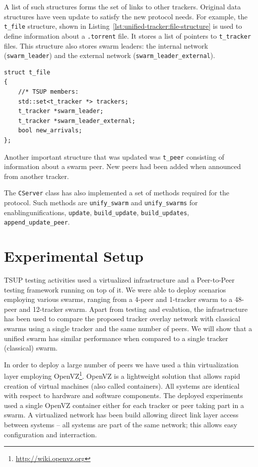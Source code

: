 A list of such structures forms the set of links to other trackers. Original
data structures have veen update to satisfy the new protocol needs. For
example, the \texttt{t\_file} structure, shown in
Listing~\ref{lst:unified-tracker:file-structure} is used to define information
about a \texttt{.torrent} file. It stores a list of pointers to
\texttt{t\_tracker} files. This structure also stores swarm leaders: the
internal network (\texttt{swarm\_leader}) and the external network
(\texttt{swarm\_leader\_external}).

\lstset{language=C,caption=File Structure,label=lst:unified-tracker:file-structure}
\begin{lstlisting}
struct t_file
{
    //* TSUP members:
    std::set<t_tracker *> trackers;
    t_tracker *swarm_leader;
    t_tracker *swarm_leader_external;
    bool new_arrivals;
};
\end{lstlisting}

Another important structure that was updated was \texttt{t\_peer} consisting
of information about a swarm peer. New peers had been added when announced
from another tracker.

The \texttt{CServer} class has also implemented a set of methods required for
the protocol. Such methods are \texttt{unify\_swarm} and
\texttt{unify\_swarms} for enablingunifications, \texttt{update},
\texttt{build\_update}, \texttt{build\_updates},
\texttt{append\_update\_peer}.

\section{Experimental Setup}
\label{sec:unified-tracker:setup}

TSUP testing activities used a virtualized infrastructure and a
Peer-to-Peer testing framework running on top of it. We were able to deploy
scenarios employing various swarms, ranging from a 4-peer and 1-tracker swarm
to a 48-peer and 12-tracker swarm. Apart from testing and evalution, the
infrastructure has been used to compare the proposed tracker overlay network
with classical swarms using a single tracker and the same number of peers. We
will show that a unified swarm has similar performance when compared to a
single tracker (classical) swarm.

In order to deploy a large number of peers we have used a thin virtualization
layer employing OpenVZ\footnote{\url{http://wiki.openvz.org}}. OpenVZ is a
lightweight solution that allows rapid creation of virtual machines (also
called containers). All systems are identical with respect to hardware and
software components. The deployed experiments used a single OpenVZ container
either for each tracker or peer taking part in a swarm. A virtualized network
has been build allowing direct link layer access between systems -- all
systems are part of the same network; this allows easy configuration and
interraction.

